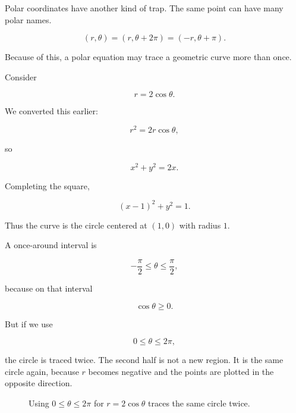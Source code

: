 Polar coordinates have another kind of trap.  The same point can have many polar
names.

\[
(r,\theta)=(r,\theta+2\pi)=(-r,\theta+\pi).
\]

Because of this, a polar equation may trace a geometric curve more than once.

Consider

\[
r=2\cos\theta.
\]

We converted this earlier:

\[
r^2=2r\cos\theta,
\]

so

\[
x^2+y^2=2x.
\]

Completing the square,

\[
(x-1)^2+y^2=1.
\]

Thus the curve is the circle centered at \((1,0)\) with radius \(1\).

A once-around interval is

\[
-\frac{\pi}{2}\le \theta\le \frac{\pi}{2},
\]

because on that interval

\[
\cos\theta\ge0.
\]

But if we use

\[
0\le\theta\le2\pi,
\]

the circle is traced twice.  The second half is not a new region.  It is the same circle
again, because \(r\) becomes negative and the points are plotted in the opposite
direction.

\begin{figure}[h]
\centering
{}
\caption{Using \(0\le\theta\le2\pi\) for \(r=2\cos\theta\) traces the same circle twice.}
\label{fig:polar-circle-traced-twice}
\end{figure}

